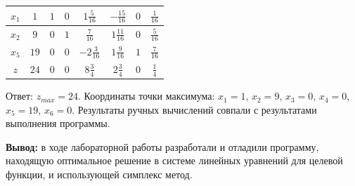 \documentclass[a4paper,14pt]{extarticle}
\begin{document}
\begin{center}
\begin{tabular}{|c|c|c|c|c|c|c|c|}
        \hline
        $x_1$            & $1$             & $1$              & $0$              & $1\frac{5}{16}$  & $-\frac{15}{16}$ & $0$   & $\frac{1}{16}$ \\
        \hline
        $x_2$            & $9$             & $0$              & $1$              & $\frac{7}{16}$   & $1\frac{11}{16}$ & $0$   & $\frac{5}{16}$ \\
        \hline
        $x_5$            & $19$            & $0$              & $0$              & $-2\frac{3}{16}$ & $1\frac{9}{16}$  & $1$   & $\frac{7}{16}$ \\
        \hline
        $z$              & $24$            & $0$              & $0$              & $8\frac{3}{4}$   & $2\frac{3}{4}$   & $0$   & $\frac{1}{4}$  \\
        \hline
    \end{tabular}
\end{center}

Ответ: $z_{max} = 24$. Координаты точки максимума: $x_1 = 1$, $x_2 = 9$, $x_3 = 0$, $x_4 = 0$, $x_5 = 19$, $x_6 = 0$. 
Результаты ручных вычислений совпали с результатами выполнения программы. 

\textbf{Вывод: } в ходе лабораторной работы разработали и отладили программу, находящую
оптимальное решение в системе линейных уравнений для целевой функции, и использующей 
симплекс метод.
\end{document}
